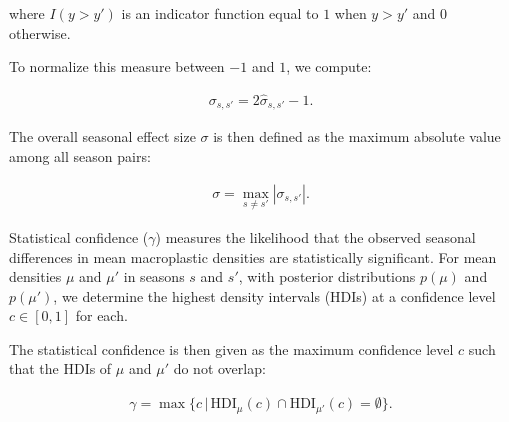 where $I(y > y')$ is an indicator function equal to $1$ when $y > y'$ and $0$ otherwise.

To normalize this measure between $-1$ and $1$, we compute:

\begin{align}
    \sigma_{s,s'} = 2\hat{\sigma}_{s,s'} - 1.
\end{align}

The overall seasonal effect size $\sigma$ is then defined as the maximum absolute value among all season pairs:

\begin{align}
    \sigma = \max_{s \neq s'} \left| \sigma_{s, s'} \right|.
\end{align}


Statistical confidence ($\gamma$) measures the likelihood that the observed seasonal differences in mean macroplastic densities are statistically significant. For mean densities $\mu$ and $\mu'$ in seasons $s$ and $s'$, with posterior distributions $p(\mu)$ and $p(\mu')$, we determine the highest density intervals (HDIs) at a confidence level $c \in [0, 1]$ for each.

The statistical confidence is then given as the maximum confidence level $c$ such that the HDIs of $\mu$ and $\mu'$ do not overlap:

\begin{align}
    \gamma = \max \{c \, | \, \text{HDI}_{\mu}(c) \cap \text{HDI}_{\mu'}(c) = \emptyset \}.
\end{align}


